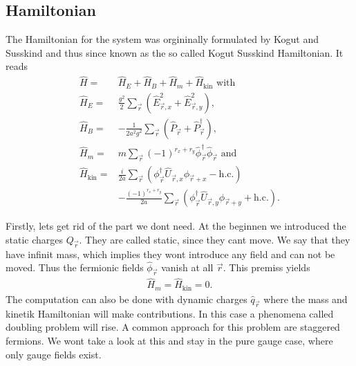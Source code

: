 \subsection{Hamiltonian}
The Hamiltonian for the system was orgininally formulated by Kogut and Susskind \cite{PhysRevD.11.395} and thus since known as the so called Kogut Susskind Hamiltonian. It reads
\begin{align*}
	\hat{H}            = & \hat{H}_E+\hat{H}_B+\hat{H}_m+\hat{H}_{\text{kin}}\text{ with}                                                              \\
	\hat{H}_E          = & \frac{g^2}{2}\sum_{\vec{r}} \left(\hat{E}^2_{\vec{r},x}+\hat{E}^2_{\vec{r},y}\right),                                       \\
	\hat{H}_B          = & -\frac{1}{2a^2g^2}\sum_{\vec{r}} \left(\hat{P}_{\vec{r}}+\hat{P}^\dag_{\vec{r}}\right),                                     \\
	\hat{H}_m          = & m\sum_{\vec{r}}(-1)^{r_x+r_y}\hat{\phi}^{\dag}_{\vec{r}}\hat{\phi}_{\vec{r}}\text{ and}                                     \\
	\hat{H}_\text{kin} = & \frac{i}{2a}\sum_{\vec{r}}\left(\phi^{\dag}_{\vec{r}}\hat{U}_{\vec{r}, x}\phi_{\vec{r}+x}-\text{h.c.}\right)                \\
	                     & -\frac{(-1)^{r_x+r_y}}{2a}\sum_{\vec{r}}\left(\phi^{\dag}_{\vec{r}}\hat{U}_{\vec{r}, y}\phi_{\vec{r}+y}+\text{h.c.}\right).
\end{align*}

Firstly, lets get rid of the part we dont need. At the beginnen we introduced the static charges $Q_{\vec{r}}$. They are called static, since they cant move. We say that they have infinit mass, which implies they wont introduce any field and can not be moved. Thus the fermionic fields $\hat{\phi}_{\vec{r}}$ vanish at all $\vec{r}$. This premiss yields
\begin{align*}
	\hat{H}_{m}=\hat{H}_{\text{kin}}=0.
\end{align*}
The computation can also be done with dynamic charges $\hat{q}_{\vec{r}}$ where the mass and kinetik Hamiltonian will make contributions. In this case a phenomena called doubling problem will rise. A common approach for this problem are staggered fermions. We wont take a look at this and stay in the pure gauge case, where only gauge fields exist.

